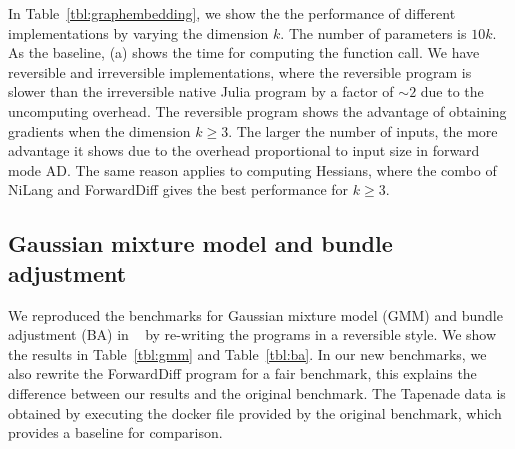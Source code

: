 \documentclass{article}
\newcommand{\<}{\langle}
\renewcommand{\>}{\rangle}
\newcommand{\Tbl}[1]{Table~\ref{#1}}
\theoremstyle{definition}\newtheorem{definition}{\textit{Definition}}
\begin{document}
In \Tbl{tbl:graphembedding}, we show the the performance of different implementations by varying the dimension $k$. The number of parameters is $10k$.
As the baseline, (a) shows the time for computing the function call. We have reversible and irreversible implementations, where the reversible program is slower than the irreversible native Julia program by a factor of $\sim2$ due to the uncomputing overhead.
The reversible program shows the advantage of obtaining gradients when the dimension $k \geq 3$. The larger the number of inputs, the more advantage it shows due to the overhead proportional to input size in forward mode AD.
The same reason applies to computing Hessians, where the combo of NiLang and ForwardDiff gives the best performance for $k \geq 3$.

\subsection{Gaussian mixture model and bundle adjustment}\label{sec:ba}

We reproduced the benchmarks for Gaussian mixture model (GMM) and bundle adjustment (BA) in ~\cite{Srajer2018} by re-writing the programs in a reversible style. We show the results in \Tbl{tbl:gmm} and \Tbl{tbl:ba}. In our new benchmarks, we also rewrite the ForwardDiff program for a fair benchmark, this explains the difference between our results and the original benchmark. The Tapenade data is obtained by executing the docker file provided by the original benchmark, which provides a baseline for comparison.
\end{document}
